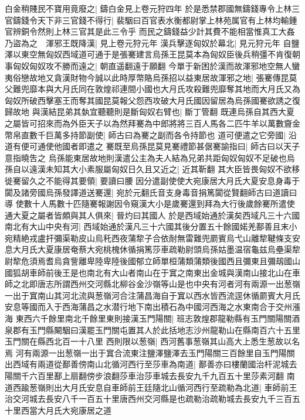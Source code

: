 白金稍賤民不寶用竟廢之|{
	鑄白金見上卷元狩四年}
於是悉禁郡國無鑄錢專令上林三官鑄錢令天下非三官錢不得行|{
	裴駰曰百官表水衡都尉掌上林苑属官有上林均輸鍾官辨銅令然則上林三官其是此三令乎}
而民之鑄錢益少計其費不能相當惟真工大姦乃盜為之　渾邪王既降漢|{
	見上卷元狩元年}
漢兵擊逐匈奴於幕北|{
	見元狩元年}
自鹽澤以東空無匈奴西域道可通于是張騫建言烏孫王昆莫本為匈奴臣後兵稍彊不肯復朝事匈奴匈奴攻不勝而遠之|{
	朝直遥翻遠于願翻}
今單于新困於漢而故渾邪地空無人蠻夷俗戀故地又貪漢財物今誠以此時厚幣賂烏孫招以益東居故渾邪之地|{
	張騫傳昆莫父難兜靡本與大月氏同在敦煌祁連間小國也大月氏攻殺難兜靡奪其地而大月氏又為匈奴所破西擊塞王而奪其國昆莫報父怨西攻破大月氏國因留居為烏孫國騫欲誘之復歸故地}
與漢結昆弟其埶宜聽聽則是斷匈奴右臂也|{
	斷丁管翻}
既連烏孫自其西大夏之屬皆可招來而為外臣天子以為然拜騫為中郎將將三百人馬各二匹牛羊以萬數齎金幣帛直數千巨萬多持節副使|{
	師古曰為騫之副而各令持節也}
道可便遣之它旁國|{
	沿道有便可通使他國者即遣之}
騫既至烏孫昆莫見騫禮節甚倨騫諭指曰|{
	師古曰以天子意指曉吿之}
烏孫能東居故地則漢遣公主為夫人結為兄弟共距匈奴匈奴不足破也烏孫自以遠漢未知其大小素服屬匈奴日久且又近之|{
	近其靳翻}
其大臣皆畏匈奴不欲移徙騫留久之不能得其要領|{
	要讀曰腰}
因分遣副使使大宛康居大月氏大夏安息身毒于闐及諸旁國烏孫發譯道送騫還|{
	宛於元翻氏音支身毒音捐篤闐從賢翻師古曰道讀曰導}
使數十人馬數十匹隨騫報謝因令窺漢大小是歲騫還到拜為大行後歲餘騫所遣使通大夏之屬者皆頗與其人俱來|{
	晉灼曰其國人}
於是西域始通於漢矣西域凡三十六國南北有大山中央有河|{
	西域始通於漢凡三十六國其後分置五十餘國婼羌鄯善且末小宛精絶戎盧扞彌渠勒皮山烏秅西夜蒲犂子合依耐無雷難兜罽賓烏弋山離犂鞬條支安息大月氏大夏康居奄蔡大宛桃槐休循捐篤莎車疏勒尉頭烏孫姑墨温宿龜兹烏壘渠犂尉犂危須焉耆烏貪訾離卑陸卑陸後國郁立師單桓蒲類蒲類後國西且彌東且彌刼國山國狐胡車師前後王是也南北有大山者南山在于窴之南東出金城與漢南山接北山在車師之北即唐志所謂西州交河縣北柳谷金沙嶺等山是也中央有河者河有兩源一出葱嶺一出于窴南山其河北流與葱嶺河合注蒲昌海自于窴以西水皆西流逕休循罽賓大月氏安息等國而入于西海蒲昌之水潜行地下南出積石為中國河西海之水東南合于交州漲海}
東西六千餘里南北千餘里東則接漢玉門陽關|{
	班志敦煌郡龍勒縣有玉門關陽關酒泉郡有玉門縣闞駰曰漢罷玉門關屯置其人於此括地志沙州龍勒山在縣南百六十五里玉門關在縣西北百一十八里}
西則限以葱嶺|{
	西河舊事葱嶺其山高大上悉生葱故以名焉}
河有兩源一出葱嶺一出于窴合流東注鹽澤鹽澤去玉門陽關三百餘里自玉門陽關出西域有兩道從鄯善傍南山北循河西行至莎車為南道|{
	鄯善亦曰樓蘭國治杆泥城去陽關千六百里鄯上扇翻傍步浪翻莎車治莎車城去長安九千九百五十里莎素河翻}
南道西踰葱嶺則出大月氏安息自車師前王廷隨北山循河西行至疏勒為北道|{
	車師前王治交河城去長安八千一百五十里唐西州交河縣是也疏勒治疏勒城去長安九千三百五十里西當大月氏大宛康居之道}

